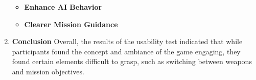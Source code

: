 \begin{enumerate}
\begin{itemize}
		\item \textbf{Enhance AI Behavior}
		\item \textbf{Clearer Mission Guidance}
	\end{itemize}
	\item \textbf{Conclusion}
	Overall, the results of the usability test indicated that while participants found the concept and ambiance of the game engaging, they found certain elements difficult to grasp, such as switching between weapons and mission objectives.
\end{enumerate}















